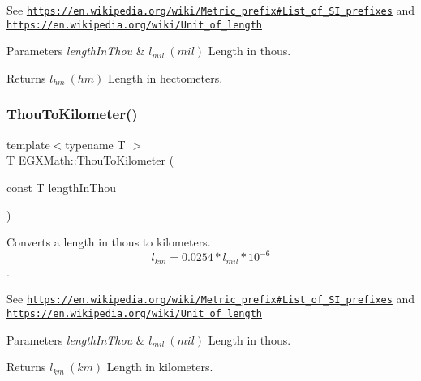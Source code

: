 See \href{https://en.wikipedia.org/wiki/Metric_prefix#List_of_SI_prefixes}{\tt https\+://en.\+wikipedia.\+org/wiki/\+Metric\+\_\+prefix\#\+List\+\_\+of\+\_\+\+S\+I\+\_\+prefixes} and \href{https://en.wikipedia.org/wiki/Unit_of_length}{\tt https\+://en.\+wikipedia.\+org/wiki/\+Unit\+\_\+of\+\_\+length} 
\begin{DoxyParams}{Parameters}
{\em length\+In\+Thou} & $ l_{mil}\ (mil)$ Length in thous. \\
\hline
\end{DoxyParams}
\begin{DoxyReturn}{Returns}
$ l_{hm}\ (hm)$ Length in hectometers. 
\end{DoxyReturn}
\mbox{\label{group___e_g_x_math-_conversions-_length_conversions-_imperial-_thou-_s_i_ga659ca5f57bc87f49d568df8a3abb5ed3}} 
\subsubsection{\texorpdfstring{Thou\+To\+Kilometer()}{ThouToKilometer()}}
{\footnotesize\ttfamily template$<$typename T $>$ \\
T E\+G\+X\+Math\+::\+Thou\+To\+Kilometer (\begin{DoxyParamCaption}\item[{const T}]{length\+In\+Thou }\end{DoxyParamCaption})}



Converts a length in thous to kilometers. \[ l_{km}=0.0254 * l_{mil} * 10^{-6} \]. 

See \href{https://en.wikipedia.org/wiki/Metric_prefix#List_of_SI_prefixes}{\tt https\+://en.\+wikipedia.\+org/wiki/\+Metric\+\_\+prefix\#\+List\+\_\+of\+\_\+\+S\+I\+\_\+prefixes} and \href{https://en.wikipedia.org/wiki/Unit_of_length}{\tt https\+://en.\+wikipedia.\+org/wiki/\+Unit\+\_\+of\+\_\+length} 
\begin{DoxyParams}{Parameters}
{\em length\+In\+Thou} & $ l_{mil}\ (mil)$ Length in thous. \\
\hline
\end{DoxyParams}
\begin{DoxyReturn}{Returns}
$ l_{km}\ (km)$ Length in kilometers. 
\end{DoxyReturn}
\mbox{\label{group___e_g_x_math-_conversions-_length_conversions-_imperial-_thou-_s_i_ga774f8033626b121ccaf369950df3dd1e}} 

